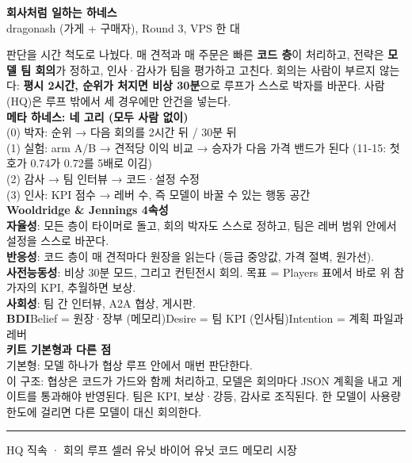 \documentclass[11pt]{article}
\begin{document}
\noindent
\begin{minipage}[t]{70mm}\raggedright
{\large\bfseries 회사처럼 일하는 하네스}\\[1mm]
{\small dragonash (가게 + 구매자), Round 3, VPS 한 대}\\[3mm]
{\scriptsize
판단을 시간 척도로 나눴다. 매 견적과 매 주문은 빠른 \textbf{코드 층}이 처리하고, 전략은 \textbf{모델 팀 회의}가 정하고, 인사·감사가 팀을 평가하고 고친다. 회의는 사람이 부르지 않는다: \textbf{평시 2시간, 순위가 처지면 비상 30분}으로 루프가 스스로 박자를 바꾼다. 사람(HQ)은 루프 밖에서 세 경우에만 안건을 넣는다.\\[3mm]

\textbf{\color{staff}메타 하네스: 네 고리 (모두 사람 없이)}\\[0.7mm]
(0) 박자: 순위 → 다음 회의를 2시간 뒤 / 30분 뒤\\[0.5mm]
(1) 실험: arm A/B → 견적당 이익 비교 → 승자가 다음 가격 밴드가 된다 (11-15: 첫 호가 0.74가 0.72를 5배로 이김)\\[0.5mm]
(2) 감사 → 팀 인터뷰 → 코드·설정 수정\\[0.5mm]
(3) 인사: KPI 점수 → 레버 수, 즉 모델이 바꿀 수 있는 행동 공간\\[3mm]

\textbf{\color{hq}Wooldridge \& Jennings 4속성}\\[0.7mm]
\textbf{자율성}: 모든 층이 타이머로 돌고, 회의 박자도 스스로 정하고, 팀은 레버 범위 안에서 설정을 스스로 바꾼다.\\[0.5mm]
\textbf{반응성}: 코드 층이 매 견적마다 원장을 읽는다 (등급 중앙값, 가격 절벽, 원가선).\\[0.5mm]
\textbf{사전능동성}: 비상 30분 모드, 그리고 컨틴전시 회의. 목표 = Players 표에서 바로 위 참가자의 KPI, 추월하면 보상.\\[0.5mm]
\textbf{사회성}: 팀 간 인터뷰, A2A 협상, 게시판.\\[3mm]

\textbf{\color{hq}BDI}\quad Belief = 원장·장부 (메모리)\quad Desire = 팀 KPI (인사팀)\quad Intention = 계획 파일과 레버\\[3mm]

\textbf{\color{hq}키트 기본형과 다른 점}\\[0.7mm]
기본형: 모델 하나가 협상 루프 안에서 매번 판단한다.\\[0.5mm]
이 구조: 협상은 코드가 가드와 함께 처리하고, 모델은 회의마다 JSON 계획을 내고 게이트를 통과해야 반영된다. 팀은 KPI, 보상·강등, 감사로 조직된다. 한 모델이 사용량 한도에 걸리면 다른 모델이 대신 회의한다.\\[3mm]

{\color{staff}\rule{1.6mm}{1.6mm}} HQ 직속 · 회의 루프\quad {\color{seller}\rule{1.6mm}{1.6mm}} 셀러 유닛\quad {\color{buyer}\rule{1.6mm}{1.6mm}} 바이어 유닛\quad {\color{code}\rule{1.6mm}{1.6mm}} 코드\quad {\color{mem}\rule{1.6mm}{1.6mm}} 메모리\quad {\color{mkt}\rule{1.6mm}{1.6mm}} 시장
}
\end{minipage}\hfill
\end{document}
